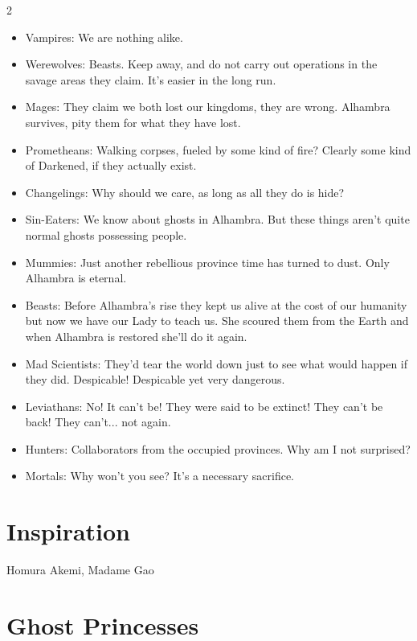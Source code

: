 \begin{multicols}{2}
\begin{itemize}
\item Vampires: We are nothing alike.
\item Werewolves: Beasts. Keep away, and do not carry out operations in the savage areas they claim. It's easier in the long run.
\item Mages: They claim we both lost our kingdoms, they are wrong. Alhambra survives, pity them for what they have lost. 
\item Prometheans: Walking corpses, fueled by some kind of fire? Clearly some kind of Darkened, if they actually exist.
\item Changelings: Why should we care, as long as all they do is hide?
\item Sin-Eaters: We know about ghosts in Alhambra. But these things aren't quite normal ghosts possessing people.
\item Mummies: Just another rebellious province time has turned to dust. Only Alhambra is eternal.
\item Beasts: Before Alhambra's rise they kept us alive at the cost of our humanity but now we have our Lady to teach us. She scoured them from the Earth and when Alhambra is restored she'll do it again. 
\item Mad Scientists: They'd tear the world down just to see what would happen if they did. Despicable! Despicable yet very dangerous.
\item Leviathans: No! It can't be! They were said to be extinct! They can't be back! They can't... not again.
\item Hunters: Collaborators from the occupied provinces. Why am I not surprised?
\item Mortals: Why won't you see? It's a necessary sacrifice. 
\end{itemize}

\section*{Inspiration}

Homura Akemi, Madame Gao


\section*{Ghost Princesses}
\label{sec:GhostPrincesses}



\end{multicols}
